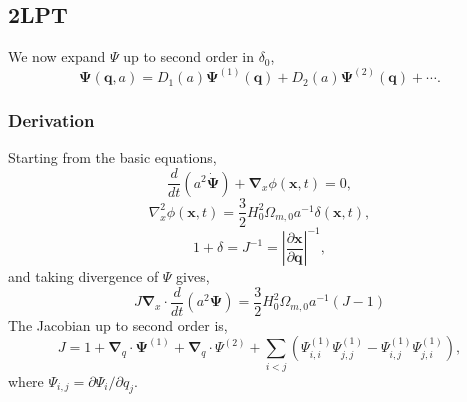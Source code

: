 \documentclass[a4paper]{article}
\begin{document}

\subsection{2LPT}
We now expand $\Psi$ up to second order in $\delta_0$,
\begin{equation}
  \bm{\Psi}(\bm{q}, a) =
    D_1(a) \bm{\Psi}^{(1)}(\bm{q}) + D_2(a) \bm{\Psi}^{(2)}(\bm{q}) + \cdots.
\end{equation}

\subsubsection{Derivation}
Starting from the basic equations,
\begin{equation}
  \frac{d}{dt} (a^2 \dot{\bm{\Psi}}) + \bm{\nabla}_x \phi(\bm{x}, t) = 0,
\end{equation}
\begin{equation}
  \nabla^2_x \phi(\bm{x}, t) =
    \frac{3}{2}H_0^2 \Omega_{m,0} a^{-1} \delta(\bm{x}, t),
\end{equation}
\begin{equation}
  1 + \delta = J^{-1} =
    \left|\frac{\partial \bm{x}}{\partial \bm{q}} \right|^{-1},
\end{equation}
and taking divergence of $\Psi$ gives,
\begin{equation}
  J \bm{\nabla}_x\cdot \frac{d}{dt}\left(a^2 \bm{\Psi} \right) =
  \frac{3}{2}H_0^2 \Omega_{m,0} a^{-1} (J - 1)
\end{equation}
The Jacobian up to second order is,
\begin{equation}
  J = 1 + \bm{\nabla}_q \cdot \bm{\Psi}^{(1)} + \bm{\nabla}_q \cdot{\Psi}^{(2)}
    + \sum_{i<j} \left( \Psi_{i,i}^{(1)} \Psi_{j,j}^{(1)} - \Psi_{i,j}^{(1)} \Psi_{j,i}^{(1)}\right),
\end{equation}
where $\Psi_{i,j} = \partial \Psi_i / \partial q_j$.
\end{document}
